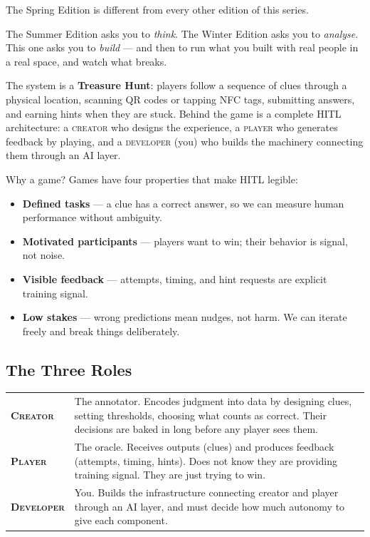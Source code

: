 \documentclass[
  11pt,
  oneside,
  DIV=12,
]{scrartcl}
\newcommand{\role}[1]{\textsc{\color{SpringLeaf}#1}}
\begin{document}
The Spring Edition is different from every other edition of this series.

The Summer Edition asks you to \emph{think}. The Winter Edition asks you to
\emph{analyse}. This one asks you to \emph{build} — and then to run what you
built with real people in a real space, and watch what breaks.

The system is a \textbf{Treasure Hunt}: players follow a sequence of clues
through a physical location, scanning QR codes or tapping NFC tags, submitting
answers, and earning hints when they are stuck. Behind the game is a complete
HITL architecture: a \role{creator} who designs the experience, a \role{player}
who generates feedback by playing, and a \role{developer} (you) who builds the
machinery connecting them through an AI layer.

\begin{infobox}{Why a game?}
  Games have four properties that make HITL legible:
  \begin{itemize}
    \item \textbf{Defined tasks} — a clue has a correct answer, so we can
          measure human performance without ambiguity.
    \item \textbf{Motivated participants} — players want to win; their
          behavior is signal, not noise.
    \item \textbf{Visible feedback} — attempts, timing, and hint requests
          are explicit training signal.
    \item \textbf{Low stakes} — wrong predictions mean nudges, not harm.
          We can iterate freely and break things deliberately.
  \end{itemize}
\end{infobox}

\subsection*{The Three Roles}

\begin{tabularx}{\linewidth}{@{}>{\bfseries\color{SpringMoss}}lX@{}}
\toprule
\role{Creator} & The annotator. Encodes judgment into data by designing clues,
  setting thresholds, choosing what counts as correct.
  Their decisions are baked in long before any player sees them. \\[4pt]
\role{Player}  & The oracle. Receives outputs (clues) and produces feedback
  (attempts, timing, hints). Does not know they are providing training signal.
  They are just trying to win. \\[4pt]
\role{Developer} & You. Builds the infrastructure connecting creator and
  player through an AI layer, and must decide how much autonomy to give
  each component. \\
\bottomrule
\end{tabularx}
\end{document}
